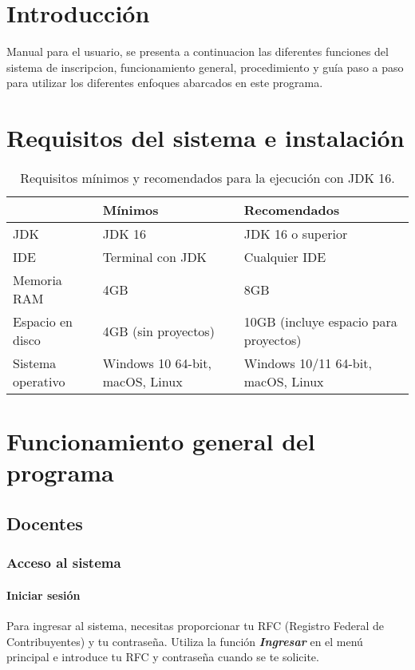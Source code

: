 \documentclass[a4paper,12pt]{article}
\begin{document}
\section{Introducción}

Manual para el usuario, se presenta a continuacion las diferentes funciones del sistema de inscripcion, funcionamiento general, procedimiento y guía paso a paso para utilizar los diferentes enfoques abarcados en este programa.


\section{Requisitos del sistema e instalación}

\begin{table}[htbp]
\centering
\begin{tabular}{|@{}l|l|l@{}|}
\toprule
 & \textbf{Mínimos} & \textbf{Recomendados} \\ \hline
JDK & JDK 16 & JDK 16 o superior \\ \hline 
IDE & Terminal con JDK & Cualquier IDE\\ \hline 
Memoria RAM & 4GB & 8GB\\ \hline 
Espacio en disco & 4GB (sin proyectos) & 10GB  (incluye espacio para proyectos)\\ \hline
Sistema operativo & Windows 10 64-bit, macOS, Linux & Windows 10/11 64-bit, macOS, Linux \\
\bottomrule \hline
\end{tabular}
\caption{Requisitos mínimos y recomendados para la ejecución con JDK 16.}
\label{tab:requisitos_desarrollo_java}
\end{table}


\section{Funcionamiento general del programa}

\subsection{Docentes}

\subsubsection{Acceso al sistema}

\paragraph{Iniciar sesión}
Para ingresar al sistema, necesitas proporcionar tu RFC (Registro Federal de Contribuyentes) y tu contraseña. Utiliza la función \textit{\textbf{Ingresar}} en el menú principal e introduce tu RFC y contraseña cuando se te solicite.
\end{document}

